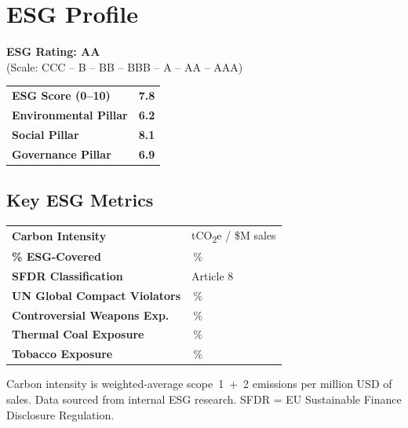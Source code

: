 \documentclass[11pt,a4paper]{article}
\makeatletter
\renewcommand{\arraystretch}{1.15}
\newcommand{\keyvaltable}[1]{%
  \bgroup
  \setlength{\parindent}{0pt}%
  \setlength{\parskip}{0pt}%
  \renewcommand{\arraystretch}{1.35}%
  \begin{tabularx}{\linewidth}{@{}>{\color{navy}\bfseries}l@{\hspace{6mm}}>{\raggedright\arraybackslash}X@{}}
    #1
  \end{tabularx}%
  \egroup
}
\newcommand{\esgbar}[1]{%
  \begin{tikzpicture}[baseline=(current bounding box.center)]
    \fill[ice] (0,0) rectangle (5.5,0.28);
    \fill[navy] (0,0) rectangle (#1*0.55,0.28);
  \end{tikzpicture}%
}
\makeatother
\begin{document}
\vspace{4pt}

\section{ESG Profile}

\noindent
\begin{minipage}[t]{0.48\linewidth}

\vspace{2pt}
\begin{factbox}
\centering
{\large\bfseries\color{darkgreen}ESG Rating: AA}\\[4pt]
{\footnotesize\color{slate}(Scale: CCC -- B -- BB -- BBB -- A -- AA -- AAA)}
\end{factbox}

\vspace{6pt}
\keyvaltable{
  ESG Score (0--10)        & \textbf{7.8} \esgbar{7.8} \\
  Environmental Pillar     & \textbf{6.2} \esgbar{6.2} \\
  Social Pillar            & \textbf{8.1} \esgbar{8.1} \\
  Governance Pillar        & \textbf{6.9} \esgbar{6.9} \\
}

\end{minipage}%
\hfill
\begin{minipage}[t]{0.48\linewidth}

\vspace{2pt}
\subsection*{Key ESG Metrics}

\keyvaltable{
  Carbon Intensity           & 78.5 tCO\textsubscript{2}e / \$M sales \\
  \% ESG-Covered     & 99.8\,\% \\
  SFDR Classification        & Article 8 \\
  UN Global Compact Violators& 0.0\,\% \\
  Controversial Weapons Exp. & 0.0\,\% \\
  Thermal Coal Exposure      & 0.3\,\% \\
  Tobacco Exposure           & 0.0\,\% \\
}

\vspace{8pt}
{\footnotesize\color{slate}
Carbon intensity is weighted-average scope~1~+~2 emissions per million USD of sales.
Data sourced from internal ESG research. SFDR = EU Sustainable Finance Disclosure Regulation.}

\end{minipage}
\end{document}
